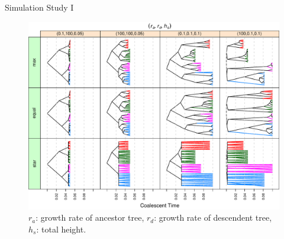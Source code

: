 \documentclass{beamer}
\begin{document}
\begin{frame}{Simulation Study I}

\vspace{-0.1cm}
\begin{center}
\begin{figure}
  \includegraphics[width=\textwidth]{./graph/ex_tree_a_sub}
  \\
  \vspace{-0.2cm}
  {\tiny
  $r_a$: growth rate of ancestor tree,
  $r_d$: growth rate of descendent tree,
  $h_s$: total height.}
\end{figure}
\end{center}

\end{frame}

\end{document}
